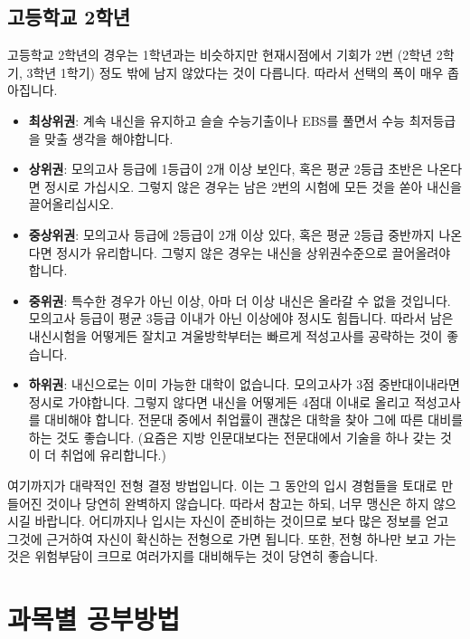 \documentclass[final]{IEEEphot}
\begin{document}
\subsection{고등학교 2학년}

\hspace{0.3cm} 고등학교 2학년의 경우는 1학년과는 비슷하지만 현재시점에서 기회가 2번 (2학년 2학기, 3학년 1학기) 정도 밖에 남지 않았다는 것이 다릅니다. 따라서 선택의 폭이 매우 좁아집니다.

\begin{itemize}
 \item \textbf{최상위권}: 계속 내신을 유지하고 슬슬 수능기출이나 EBS를 풀면서 수능 최저등급을 맞출 생각을 해야합니다.
 \item \textbf{상위권}: 모의고사 등급에 1등급이 2개 이상 보인다, 혹은 평균 2등급 초반은 나온다면 정시로 가십시오. 그렇지 않은 경우는 남은 2번의 시험에 모든 것을 쏟아 내신을 끌어올리십시오.
 \item \textbf{중상위권}: 모의고사 등급에 2등급이 2개 이상 있다, 혹은 평균 2등급 중반까지 나온다면 정시가 유리합니다. 그렇지 않은 경우는 내신을 상위권수준으로 끌어올려야 합니다.
 \item \textbf{중위권}: 특수한 경우가 아닌 이상, 아마 더 이상 내신은 올라갈 수 없을 것입니다. 모의고사 등급이 평균 3등급 이내가 아닌 이상에야 정시도 힘듭니다. 따라서 남은 내신시험을 어떻게든 잘치고
 겨울방학부터는 빠르게 적성고사를 공략하는 것이 좋습니다.
 \item \textbf{하위권}: 내신으로는 이미 가능한 대학이 없습니다. 모의고사가 3점 중반대이내라면 정시로 가야합니다. 그렇지 않다면 내신을 어떻게든 4점대 이내로 올리고 적성고사를 대비해야 합니다.
 전문대 중에서 취업률이 괜찮은 대학을 찾아 그에 따른 대비를 하는 것도 좋습니다. (요즘은 지방 인문대보다는 전문대에서 기술을 하나 갖는 것이 더 취업에 유리합니다.)
\end{itemize}

여기까지가 대략적인 전형 결정 방법입니다. 이는 그 동안의 입시 경험들을 토대로 만들어진 것이나 당연히 완벽하지 않습니다. 따라서 참고는 하되, 너무 맹신은 하지 않으시길 바랍니다.
어디까지나 입시는 자신이 준비하는 것이므로 보다 많은 정보를 얻고 그것에 근거하여 자신이 확신하는 전형으로 가면 됩니다. 또한, 전형 하나만 보고 가는 것은 위험부담이 크므로 여러가지를
대비해두는 것이 당연히 좋습니다.

\pagebreak

\section{과목별 공부방법}
\end{document}
